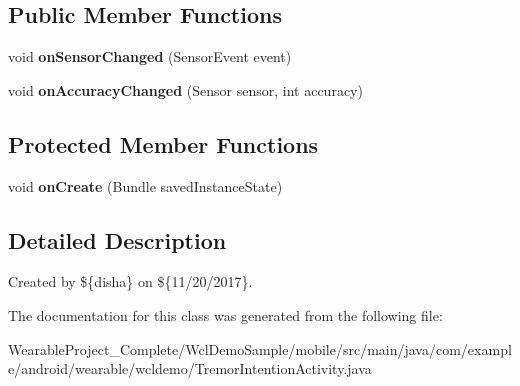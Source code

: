 \subsection*{Public Member Functions}
\begin{DoxyCompactItemize}
\item 
void {\bfseries on\+Sensor\+Changed} (Sensor\+Event event)\hypertarget{classcom_1_1example_1_1android_1_1wearable_1_1wcldemo_1_1TremorIntentionActivity_adf5789c69e2de89b36894200176cd633}{}\label{classcom_1_1example_1_1android_1_1wearable_1_1wcldemo_1_1TremorIntentionActivity_adf5789c69e2de89b36894200176cd633}

\item 
void {\bfseries on\+Accuracy\+Changed} (Sensor sensor, int accuracy)\hypertarget{classcom_1_1example_1_1android_1_1wearable_1_1wcldemo_1_1TremorIntentionActivity_a63dfe2ade4d0d5c05bb569b86bf53628}{}\label{classcom_1_1example_1_1android_1_1wearable_1_1wcldemo_1_1TremorIntentionActivity_a63dfe2ade4d0d5c05bb569b86bf53628}

\end{DoxyCompactItemize}
\subsection*{Protected Member Functions}
\begin{DoxyCompactItemize}
\item 
void {\bfseries on\+Create} (Bundle saved\+Instance\+State)\hypertarget{classcom_1_1example_1_1android_1_1wearable_1_1wcldemo_1_1TremorIntentionActivity_ae879abe4a6b7f8b932bae6b2f24f248b}{}\label{classcom_1_1example_1_1android_1_1wearable_1_1wcldemo_1_1TremorIntentionActivity_ae879abe4a6b7f8b932bae6b2f24f248b}

\end{DoxyCompactItemize}


\subsection{Detailed Description}
Created by \$\{disha\} on \$\{11/20/2017\}. 

The documentation for this class was generated from the following file\+:\begin{DoxyCompactItemize}
\item 
Wearable\+Project\+\_\+\+Complete/\+Wcl\+Demo\+Sample/mobile/src/main/java/com/example/android/wearable/wcldemo/Tremor\+Intention\+Activity.\+java\end{DoxyCompactItemize}
